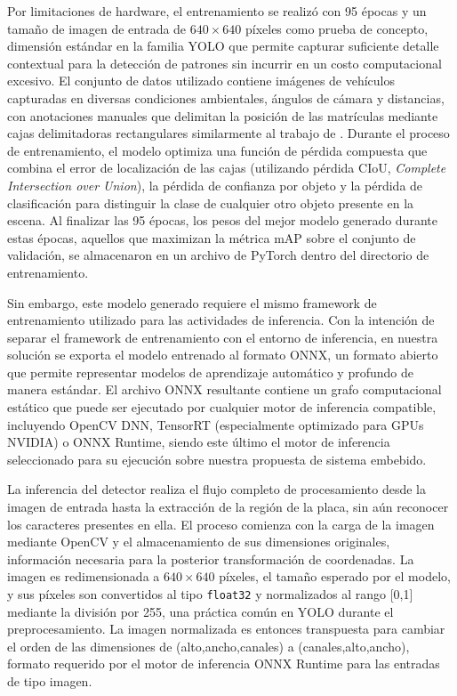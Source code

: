 Por limitaciones de hardware, el entrenamiento se realizó con 95 épocas y un tamaño de imagen de entrada de $640\times 640$ píxeles como prueba de concepto, dimensión estándar en la familia YOLO que permite capturar suficiente detalle contextual para la detección de patrones sin incurrir en un costo computacional excesivo. El conjunto de datos utilizado contiene imágenes de vehículos capturadas en diversas condiciones ambientales, ángulos de cámara y distancias, con anotaciones manuales que delimitan la posición de las matrículas mediante cajas delimitadoras rectangulares similarmente al trabajo de \cite{tomas-alcantara2023}. Durante el proceso de entrenamiento, el modelo optimiza una función de pérdida compuesta que combina el error de localización de las cajas (utilizando pérdida CIoU, \textit{Complete Intersection over Union}), la pérdida de confianza por objeto y la pérdida de clasificación para distinguir la clase  de cualquier otro objeto presente en la escena. Al finalizar las 95 épocas, los pesos del mejor modelo generado durante estas épocas, aquellos que maximizan la métrica mAP sobre el conjunto de validación, se almacenaron en un archivo de PyTorch dentro del directorio de entrenamiento.

Sin embargo, este modelo generado requiere el mismo framework de entrenamiento utilizado para las actividades de inferencia. Con la intención de separar el framework de entrenamiento con el entorno de inferencia, en nuestra solución se exporta el modelo entrenado al formato ONNX, un formato abierto que permite representar modelos de aprendizaje automático y profundo de manera estándar. El archivo ONNX resultante contiene un grafo computacional estático que puede ser ejecutado por cualquier motor de inferencia compatible, incluyendo OpenCV DNN, TensorRT (especialmente optimizado para GPUs NVIDIA) o ONNX Runtime, siendo este último el motor de inferencia seleccionado para su ejecución sobre nuestra propuesta de sistema embebido.

La inferencia del detector realiza el flujo completo de procesamiento desde la imagen de entrada hasta la extracción de la región de la placa, sin aún reconocer los caracteres presentes en ella. El proceso comienza con la carga de la imagen mediante OpenCV y el almacenamiento de sus dimensiones originales, información necesaria para la posterior transformación de coordenadas. La imagen es redimensionada a $640\times 640$ píxeles, el tamaño esperado por el modelo, y sus píxeles son convertidos al tipo \texttt{float32} y normalizados al rango [0,1] mediante la división por 255, una práctica común en YOLO durante el preprocesamiento. La imagen normalizada es entonces transpuesta para cambiar el orden de las dimensiones de (alto,ancho,canales) a (canales,alto,ancho), formato requerido por el motor de inferencia ONNX Runtime para las entradas de tipo imagen.

